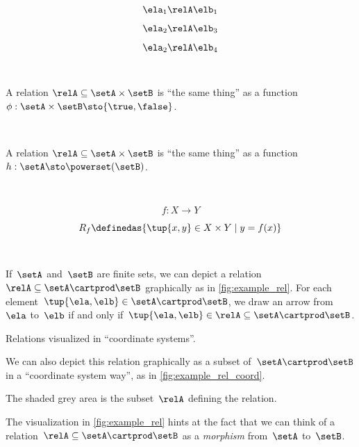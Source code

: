 {$$ \ela_1 \relA \elb_1 \label{eq:slides-16}$$

$$ \ela_2 \relA \elb_3 \label{eq:slides-17}$$

$$ \ela_2 \relA \elb_4 \label{eq:slides-18}$$

\

A relation $\relA \subseteq \setA \times \setB$ is ``the same thing'' as a function $\phi : \setA \times \setB \sto \{\true, \false\}$.

\


A relation $\relA \subseteq \setA \times \setB$ is ``the same thing'' as a function $h : \setA  \sto \powerset (\setB)$.

\

$$
f : X \to Y
$$


$$
R_f \definedas \{ \tup{x, y} \in X \times Y \mid y = f(x) \}
$$


}

\


\begin{marginfigure}
  \centering
  \caption{}
  \label{fig:example_rel}
\end{marginfigure}

If~$\setA$ and~$\setB$ are finite sets, we can depict a relation~$\relA \subseteq \setA \cartprod \setB$ graphically as in \cref{fig:example_rel}. For each element~$\tup{\ela,\elb} \in \setA \cartprod \setB$, we draw an arrow from~$\ela$ to~$\elb$ if and only if~$\tup{\ela,\elb} \in \relA \subseteq \setA \cartprod \setB$.


\begin{marginfigure}
  \begin{center}
  \end{center}
  \caption{Relations visualized in ``coordinate systems''.}
  \label{fig:example_rel_coord}
\end{marginfigure}

We can also depict this relation graphically as a subset of~$\setA \cartprod \setB$ in a ``coordinate system way'', as in \cref{fig:example_rel_coord}.

The shaded grey area is the subset~$\relA$ defining the relation.



The visualization in \cref{fig:example_rel} hints at the fact that we can think of a relation~$\relA \subseteq \setA \cartprod \setB$ as a \emph{morphism} from~$\setA$ to~$\setB$.


